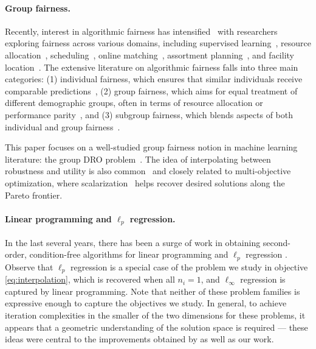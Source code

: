 \paragraph{Group fairness.} 
Recently, interest in algorithmic fairness has intensified~\citep{barocas2016big, abebe2020roles, kasy2021fairness} with researchers exploring fairness across various domains, including supervised learning~\citep{calders2009building, dwork2012fairness, hardt2016equality, kusner2017counterfactual, goel2018non, ustun2019fairness}, resource allocation~\citep{bertsimas2011price, bertsimas2012efficiency, hooker2012combining, donahue2020fairness, manshadi2021fair}, scheduling~\citep{mulvany2021fair}, online matching~\citep{chierichetti2019matroids, ma2023fairness}, assortment planning~\citep{singh2018fairness, biega2018equity, singh2019policy, chen2022fair}, and facility location~\citep{gupta2022socially}. The extensive literature on algorithmic fairness falls into three main categories: (1) individual fairness, which ensures that similar individuals receive comparable predictions~\citep{dwork2012fairness, loi2019philosophical, chen2022fair}, (2) group fairness, which aims for equal treatment of different demographic groups, often in terms of resource allocation or performance parity~\citep{singh2018fairness, balseiro2021regularized}, and (3) subgroup fairness, which blends aspects of both individual and group fairness~\citep{kearns2018preventing, kearns2019empirical}. 

This paper focuses on a well-studied group fairness notion in machine learning literature: the group DRO problem~\citep{ben2013robust, duchi2016statistics, sagawa2019distributionally}. The idea of interpolating between robustness and utility is also common~\citep{golrezaei2024online} and closely related to multi-objective optimization, where scalarization~\citep{miettinen1999nonlinear, ehrgott2005multicriteria} helps recover desired solutions along the Pareto frontier. 

\paragraph{Linear programming and $\ell_p$ regression.} 
In the last several years, there has been a surge of work in obtaining second-order, condition-free algorithms for linear programming and $\ell_p$ regression \citep{bcll18,ls19,akps19,jls21}. Observe that $\ell_p$ regression is a special case of the problem we study in objective \eqref{eq:interpolation}, which is recovered when all $n_i=1$, and $\ell_{\infty}$ regression is captured by linear programming. Note that neither of these problem families is expressive enough to capture the objectives we study. In general, to achieve iteration complexities in the smaller of the two dimensions for these problems, it appears that a geometric understanding of the solution space is required --- these ideas were central to the improvements obtained by \citet{ls19,jls21} as well as our work.

